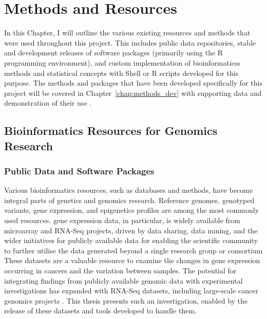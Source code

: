 \chapter{Methods and Resources}
\label{chap:methods}

In this Chapter, I will outline the various existing resources and methods that were used throughout this project. This includes public data repositories, stable and development releases of software packages (primarily using the R programming environment), and custom implementation of \glspl{bioinformatics} methods and statistical concepts with Shell or R scripts developed for this purpose. The methods and packages that have been developed specifically for this project will be covered in Chapter~\ref{chap:methods_dev} with supporting data and demonstration of their use . 

\section{Bioinformatics Resources for Genomics Research}
\subsection{Public Data and Software Packages}
Various \gls{bioinformatics} resources, such as databases and methods, have become integral parts of genetics and \glspl{genomic} research. Reference \glspl{genome}, genotyped variants, \gls{gene expression}, and epigenetics profiles are among the most commonly used resources. \Gls{gene expression} data, in particular, is widely available from \gls{microarray} and \gls{RNA-Seq} projects, %
driven by data sharing, data mining, and the wider initiatives for publicly available data for enabling the scientific community to further utilise the data generated beyond a single research group or consortium \citep{Rung2013}
These datasets are a valuable resource to examine the changes in \gls{gene expression} occurring in cancers and the variation between samples. The potential for integrating findings from publicly available \gls{genomic} data with experimental investigations has expanded with \gls{RNA-Seq} datasets, including large-scale cancer \glspl{genomic} projects \citep{ICGC2011}. This thesis presents such an investigation, enabled by the release of these datasets and tools developed %
to handle them.
 
